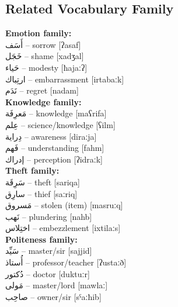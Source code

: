 \documentclass[a4paper,12pt]{article}
\begin{document}
\subsection{Related Vocabulary Family}
\begin{multicols}{2}
\textbf{Emotion family:}\\
\textarabic{أَسَف} – sorrow [ʔasaf]\\
\textarabic{خَجَل} – shame [xadʒal]\\
\textarabic{حَياء} – modesty [ħajaːʔ]\\
\textarabic{ارتِباك} – embarrassment [irtabaːk]\\
\textarabic{نَدَم} – regret [nadam]\\

\textbf{Knowledge family:}\\
\textarabic{مَعرِفَة} – knowledge [maʕrifa]\\
\textarabic{عِلم} – science/knowledge [ʕilm]\\
\textarabic{دِراية} – awareness [diraːja]\\
\textarabic{فَهم} – understanding [fahm]\\
\textarabic{إدراك} – perception [ʔidraːk]\\

\textbf{Theft family:}\\
\textarabic{سَرِقَة} – theft [sariqa]\\
\textarabic{سارِق} – thief [saːriq]\\
\textarabic{مَسروق} – stolen (item) [masruːq]\\
\textarabic{نَهب} – plundering [nahb]\\
\textarabic{اختِلاس} – embezzlement [ixtilaːs]\\

\textbf{Politeness family:}\\
\textarabic{سَيِّد} – master/sir [sajjid]\\
\textarabic{أُستاذ} – professor/teacher [ʔustaːð]\\
\textarabic{دُكتور} – doctor [duktuːr]\\
\textarabic{مَولى} – master/lord [mawlaː]\\
\textarabic{صاحِب} – owner/sir [sˤaːħib]
\end{multicols}
\end{document}
